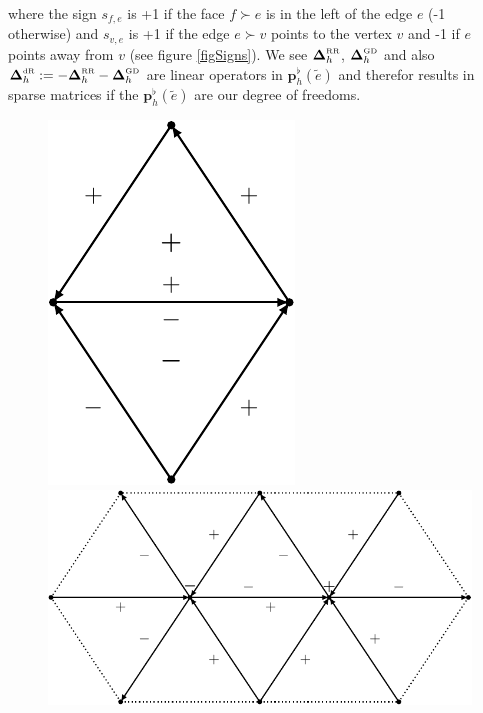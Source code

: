 \documentclass[a4paper,11pt]{scrartcl}
\newcommand{\pflh}{\mathbf{p}^{\flat}_{h}}
\newcommand{\LB}{\boldsymbol{\Delta}^{\text{\tiny RR}}}
\newcommand{\LCB}{\boldsymbol{\Delta}^{\text{\tiny GD}}}
\newcommand{\LDR}{\boldsymbol{\Delta}^{\text{\tiny dR}}}
\newcommand{\LBh}{\LB_{h}}
\newcommand{\LCBh}{\LCB_{h}}
\newcommand{\LDRh}{\LDR_{h}}
\begin{document}
    where the sign \( s_{f,e} \) is +1 if the face \( f\succ e \) is in the left of the edge \( e \) (-1 otherwise)
    and \( s_{v,e} \) is +1 if the edge \( e\succ v \) points to the vertex \( v \) and -1 if \( e \) points away from \( v \)
    (see figure \ref{figSigns}).
    We see \( \LBh \), \( \LCBh \) and also \( \LDRh := -\LBh -\LCBh \) are linear operators in \( \pflh(\tilde{e}) \)
    and therefor results in sparse matrices if the \( \pflh(\tilde{e}) \) are our degree of freedoms.
    \begin{figure}
      \begin{minipage}[htp]{.25\textwidth}
        \centering
        \includegraphics[width=.9\textwidth]{bilder/tikz/LBDEC.pdf}
      \end{minipage}\hfill
      \begin{minipage}[htp]{.7\textwidth}
        \centering
        \includegraphics[width=.9\textwidth]{bilder/tikz/LCBDEC.pdf}

\end{minipage}
\end{figure}
\end{document}
